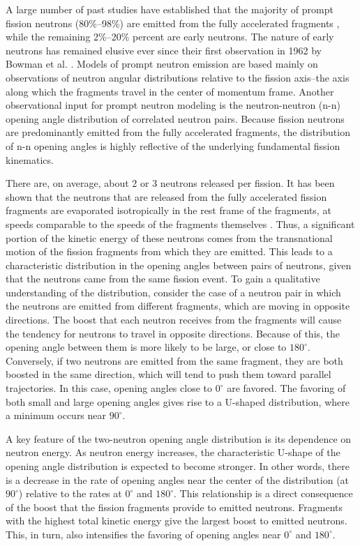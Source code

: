 A large number of past studies have established that the majority of prompt fission neutrons (80\%--98\%) are emitted from the fully accelerated fragments \cite{Scission2005}, while the remaining 2\%--20\% percent are early neutrons.  The nature of early neutrons has remained elusive ever since their first observation in 1962 by Bowman et al. \cite{Bowman}. Models of prompt neutron emission are based mainly on observations of neutron angular distributions relative to the fission axis--the axis along which the fragments travel in the center of momentum frame. Another observational input for prompt neutron modeling is the neutron-neutron (n-n) opening angle distribution of correlated neutron pairs. Because fission neutrons are predominantly emitted from the fully accelerated fragments, the distribution of n-n opening angles is highly reflective of the underlying fundamental fission kinematics.

There are, on average, about 2 or 3 neutrons released per fission. It has been shown that the neutrons that are released from the fully accelerated fission fragments are evaporated isotropically in the rest frame of the fragments, at speeds comparable to the speeds of the fragments themselves \cite{fragmentRestFrame}. Thus, a significant portion of the kinetic energy of these neutrons comes from the transnational motion of the fission fragments from which they are emitted. This leads to a characteristic distribution in the opening angles between pairs of neutrons, given that the neutrons came from the same fission event. 
To gain a qualitative understanding of the distribution, consider the case of a neutron pair in which the neutrons are emitted from different fragments, which are moving in opposite directions. The boost that each neutron receives from the fragments will cause the tendency for neutrons to travel in opposite directions. Because of this, the opening angle between them is more likely to be large, or close to $180^{\circ}$. Conversely, if two neutrons are emitted from the same fragment, they are both boosted in the same direction, which will tend to push them toward parallel trajectories. In this case, opening angles close to $0^{\circ}$ are favored. The favoring of both small and large opening angles gives rise to a U-shaped distribution, where a minimum occurs near $90^{\circ}$. 

A key feature of the two-neutron opening angle distribution is its dependence on neutron energy. As neutron energy increases, the characteristic U-shape of the opening angle distribution is expected to become stronger. In other words, there is a decrease in the rate of opening angles near the center of the distribution (at $90^{\circ}$) relative to the rates at $0^{\circ}$ and $180^{\circ}$. This relationship is a direct consequence of the boost that the fission fragments provide to emitted neutrons. Fragments with the highest total kinetic energy give the largest boost to emitted neutrons. This, in turn, also intensifies the favoring of opening angles near $0^{\circ}$ and $180^{\circ}$. 

